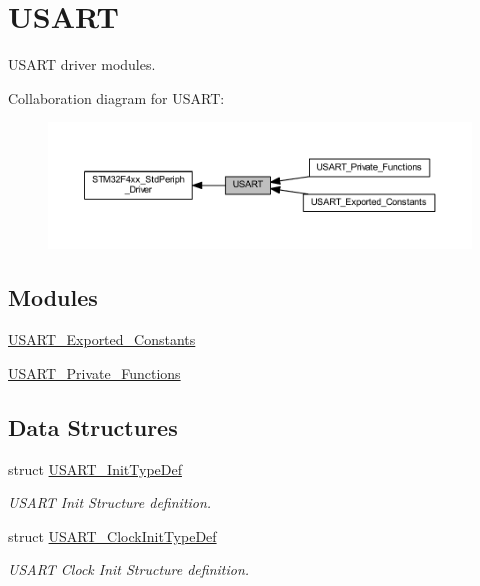 \hypertarget{group___u_s_a_r_t}{}\section{U\+S\+A\+RT}
\label{group___u_s_a_r_t}


U\+S\+A\+RT driver modules.  


Collaboration diagram for U\+S\+A\+RT\+:\nopagebreak
\begin{figure}[H]
\begin{center}
\leavevmode
\includegraphics[width=350pt]{group___u_s_a_r_t}
\end{center}
\end{figure}
\subsection*{Modules}
\begin{DoxyCompactItemize}
\item 
\hyperlink{group___u_s_a_r_t___exported___constants}{U\+S\+A\+R\+T\+\_\+\+Exported\+\_\+\+Constants}
\item 
\hyperlink{group___u_s_a_r_t___private___functions}{U\+S\+A\+R\+T\+\_\+\+Private\+\_\+\+Functions}
\end{DoxyCompactItemize}
\subsection*{Data Structures}
\begin{DoxyCompactItemize}
\item 
struct \hyperlink{struct_u_s_a_r_t___init_type_def}{U\+S\+A\+R\+T\+\_\+\+Init\+Type\+Def}
\begin{DoxyCompactList}\small\item\em U\+S\+A\+RT Init Structure definition. \end{DoxyCompactList}\item 
struct \hyperlink{struct_u_s_a_r_t___clock_init_type_def}{U\+S\+A\+R\+T\+\_\+\+Clock\+Init\+Type\+Def}
\begin{DoxyCompactList}\small\item\em U\+S\+A\+RT Clock Init Structure definition. \end{DoxyCompactList}\end{DoxyCompactItemize}
